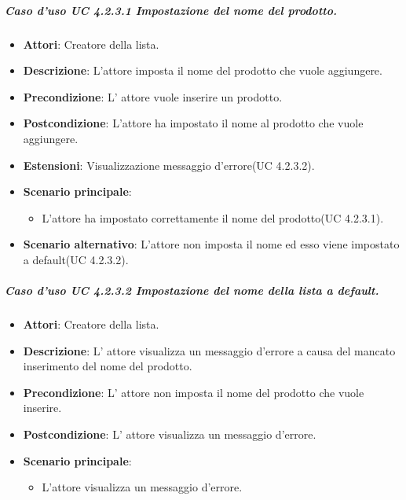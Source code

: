 \subparagraph{Caso d'uso UC 4.2.3.1 Impostazione del nome del prodotto.}
	\begin{itemize}
		\item\textbf{Attori}: Creatore della lista.
		\item\textbf{Descrizione}: L'attore imposta il nome del prodotto che vuole aggiungere.
		\item\textbf{Precondizione}: L' attore vuole inserire un prodotto.
		\item\textbf{Postcondizione}: L'attore ha impostato il nome al prodotto che vuole aggiungere.
		\item\textbf{Estensioni}: Visualizzazione messaggio d'errore(UC 4.2.3.2).
		\item\textbf{Scenario principale}:
			\begin{itemize}
				\item L'attore ha impostato correttamente il nome del prodotto(UC 4.2.3.1). 
			\end{itemize}
		\item\textbf{Scenario alternativo}: L'attore non imposta il nome ed esso viene impostato a default(UC 4.2.3.2).
		
	\end{itemize}
	
	
\subparagraph{Caso d'uso UC 4.2.3.2 Impostazione del nome della lista a default.}
	\begin{itemize}
		\item\textbf{Attori}: Creatore della lista.
		\item\textbf{Descrizione}: L' attore visualizza un messaggio d'errore a causa del mancato inserimento del nome del prodotto.
		\item\textbf{Precondizione}: L' attore non imposta il nome del prodotto che vuole inserire.
		\item\textbf{Postcondizione}: L' attore visualizza un messaggio d'errore.
		\item\textbf{Scenario principale}:
			\begin{itemize}
				\item L'attore visualizza un messaggio d'errore. 
			\end{itemize}
		
	\end{itemize}
	
